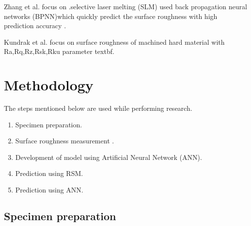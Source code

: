 \documentclass[suppldata]{interact}
\begin{document}
 Zhang et al. focus on .selective laser melting (SLM) used back propagation neural networks (BPNN)which quickly predict the surface roughness with high prediction accuracy \textbf{\cite{zhang2023prediction}}.

 Kundrak et al. focus on surface roughness of machined hard material with Ra,Rq,Rz,Rsk,Rku parameter textbf{\cite{kundrak2021accuracy}}.
\section{Methodology}
The steps mentioned below are used while performing research.
\begin{enumerate}
             \item Specimen preparation.
	      \item Surface roughness measurement .
            \item Development of model using Artificial Neural Network (ANN).
            \item Prediction using RSM. 
            \item Prediction using ANN. 
\end{enumerate}
\subsection{Specimen preparation}
 
\end{document}
